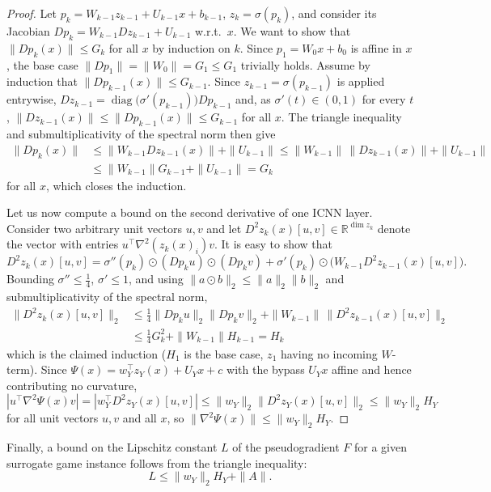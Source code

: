 \documentclass[11pt, a4paper]{article}
\newcommand{\rr}{\mathbb{R}}
\theoremstyle{remark}
\theoremstyle{plain}
\begin{document}
\begin{proof}
Let $p_k=W_{k-1}z_{k-1}+U_{k-1}x+b_{k-1}$, $z_k=\sigma(p_k)$, and consider its Jacobian $Dp_k=W_{k-1}Dz_{k-1}+U_{k-1}$ w.r.t.~$x$. We want to show that $\|Dp_k(x)\|\leq G_k$ for all $x$ by induction on $k$. 
Since $p_1=W_0x+b_0$ is affine in $x$, the base case $\|Dp_1\|=\|W_0\|=G_1\leq G_1$ trivially holds.
Assume by induction that $\|Dp_{k-1}(x)\|\leq G_{k-1}$. Since $z_{k-1}=\sigma(p_{k-1})$ is applied entrywise, $Dz_{k-1}=\operatorname{diag}\bigl(\sigma'(p_{k-1})\bigr)Dp_{k-1}$ and, as $\sigma'(t)\in(0,1)$ for every $t$, $\|Dz_{k-1}(x)\|\leq\|Dp_{k-1}(x)\|\leq G_{k-1}$ for all $x$. The triangle inequality and submultiplicativity of the spectral norm then give
\[
\begin{aligned}
\|Dp_k(x)\|&\leq\|W_{k-1}Dz_{k-1}(x)\|+\|U_{k-1}\|\leq\|W_{k-1}\|\,\|Dz_{k-1}(x)\|+\|U_{k-1}\|\\
&\leq\|W_{k-1}\|G_{k-1}+\|U_{k-1}\|=G_k
\end{aligned}
\]
for all $x$, which closes the induction. 

Let us now compute a bound on the second derivative of one ICNN layer. Consider two arbitrary unit vectors $u,v$ and let $D^2z_k(x)[u,v]\in\rr^{\dim z_k}$ denote the vector with entries $u^\top\nabla^2(z_{k}(x)_i)v$. It is easy to show that
\[
    D^2z_k(x)[u,v]=\sigma''(p_k)\odot(Dp_ku)\odot(Dp_kv)+\sigma'(p_k)\odot\bigl(W_{k-1}D^2z_{k-1}(x)[u,v]\bigr).
\]
Bounding $\sigma''\leq\tfrac14$, $\sigma'\leq1$, and using $\|a\odot b\|_2\leq\|a\|_2\|b\|_2$ and submultiplicativity of the spectral norm,
\[
\begin{aligned}
\|D^2z_k(x)[u,v]\|_2&\leq\tfrac14\|Dp_ku\|_2\|Dp_kv\|_2+\|W_{k-1}\|\,\|D^2z_{k-1}(x)[u,v]\|_2\\
&\leq\tfrac14G_k^2+\|W_{k-1}\|H_{k-1}=H_k
\end{aligned}
\]
which is the claimed induction ($H_1$ is the base case, $z_1$ having no incoming $W$-term). Since $\Psi(x)=w_Y^\top z_Y(x)+U_Yx+c$ with the bypass $U_Yx$ affine and hence contributing no curvature,
\[
|u^\top\nabla^2\Psi(x)v|=|w_Y^\top D^2z_Y(x)[u,v]|\leq\|w_Y\|_2\|D^2z_Y(x)[u,v]\|_2\leq\|w_Y\|_2H_Y
\]
for all unit vectors $u,v$ and all $x$, so $\|\nabla^2\Psi(x)\|\leq\|w_Y\|_2H_Y$.
\end{proof}

\noindent Finally, a bound on the Lipschitz constant $L$ of the pseudogradient $F$ for a given surrogate game instance follows from the triangle inequality:
\begin{equation}
    L\leq\|w_Y\|_2H_Y+\|A\|.
\label{eq:L(p)}
\end{equation}
\end{document}
